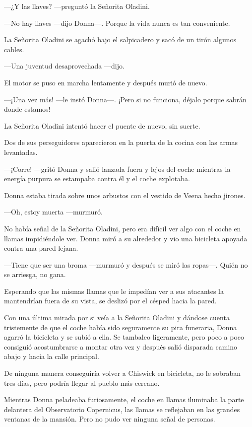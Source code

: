---¿Y las llaves? ---preguntó la Señorita Oladini.

---No hay llaves ---dijo Donna---. Porque la vida nunca es tan
conveniente.

La Señorita Oladini se agachó bajo el salpicadero y sacó de un
tirón algunos cables.

---Una juventud desaprovechada ---dijo.

El motor se puso en marcha lentamente y después murió de nuevo.

---¡Una vez más! ---le instó Donna---. ¡Pero si no funciona,
déjalo porque sabrán donde estamos!

La Señorita Oladini intentó hacer el puente de nuevo, sin
suerte.

Dos de sus perseguidores aparecieron en la puerta de la cocina
con las armas levantadas.

---¡Corre! ---gritó Donna y salió lanzada fuera y lejos del
coche mientras la energía purpura se estampaba contra él y el coche
explotaba.

Donna estaba tirada sobre unos arbustos con el vestido de Veena
hecho jirones.

---Oh, estoy muerta ---murmuró.

No había señal de la Señorita Oladini, pero era difícil ver algo
con el coche en llamas impidiéndole ver. Donna miró a su alrededor y vio
una bicicleta apoyada contra una pared lejana.

---Tiene que ser una broma ---murmuró y después se miró las
ropas---. Quién no se arriesga, no gana.

Esperando que las mismas llamas que le impedían ver a sus
atacantes la mantendrían fuera de su vista, se deslizó por el césped
hacia la pared.

Con una última mirada por si veía a la Señorita Oladini y
dándose cuenta tristemente de que el coche había sido seguramente su
pira funeraria, Donna agarró la bicicleta y se subió a ella. Se tambaleo
ligeramente, pero poco a poco consiguió acostumbrarse a montar otra vez
y después salió disparada camino abajo y hacia la calle principal.

De ninguna manera conseguiría volver a Chiswick en bicicleta, no le
sobraban tres días, pero podría llegar al pueblo más cercano.

Mientras Donna peladeaba furiosamente, el coche en llamas iluminaba la
parte delantera del Observatorio Copernicus, las llamas se reflejaban en
las grandes ventanas de la mansión. Pero no pudo ver ninguna señal de
personas.